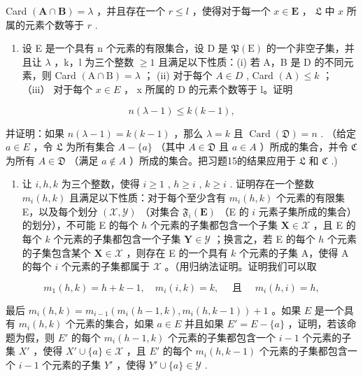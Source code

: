 Card \((\mathbf{A} \cap \mathbf{B}) = \lambda\) ，并且存在一个 \(r \leqslant l\) ，使得对于每一个 \(x \in \mathbf{E}\) ， \(\mathfrak{L}\) 中 \(x\) 所属的元素个数等于 \(r\) .

\begin{enumerate}
\def\labelenumi{\arabic{enumi}.}
\setcounter{enumi}{15}
\tightlist
\item
  设 E 是一个具有 n 个元素的有限集合，设 D 是 \(\mathfrak{P}(\mathrm{E})\) 的一个非空子集，并且让 \(\lambda\) ，k，l 为三个整数 \(\geqslant 1\) 且满足以下性质：(i) 若 A，B 是 D 的不同元素，则 Card \((\mathrm{A} \cap \mathrm{B}) = \lambda\) ； (ii) 对于每个 \(A \in D\) , Card \((\mathrm{A}) \leqslant k\) ； （iii） 对于每个 \(x \in E\) ， x 所属的 D 的元素个数等于 l。证明
\end{enumerate}

\[
n (\lambda - 1) \leqslant k (k - 1),
\]

并证明：如果 \(n(\lambda - 1) = k(k - 1)\) ，那么 \(\lambda = k\) 且 \(\operatorname{Card}(\mathfrak{D}) = n\) . （给定 \(a \in E\) ，令 \(\mathfrak{L}\) 为所有集合 \(A - \{a\}\) （其中 \(A \in \mathfrak{D}\) 且 \(a \in A\) ）所成的集合，并令 \(\mathfrak{C}\) 为所有 \(A \in \mathfrak{D}\) （满足 \(a \notin A\) ）所成的集合。把习题15的结果应用于 \(\mathfrak{L}\) 和 \(\mathfrak{C}\) .)

\begin{enumerate}
\def\labelenumi{\arabic{enumi}.}
\setcounter{enumi}{16}
\tightlist
\item
  让 \(i, h, k\) 为三个整数，使得 \(i \geqslant 1\) , \(h \geqslant i\) , \(k \geqslant i\) . 证明存在一个整数 \(m_i(h, k)\) 且满足以下性质：对于每个至少含有 \(m_i(h, k)\) 个元素的有限集 E，以及每个划分 \((\mathcal{X}, \mathcal{Y})\) （对集合 \(\mathfrak{F}_i(\mathbf{E})\) （E 的 \(i\) 元素子集所成的集合）的划分），不可能 E 的每个 \(h\) 个元素的子集都包含一个子集 \(\mathbf{X} \in \mathcal{X}\) ，且 E 的每个 \(k\) 个元素的子集都包含一个子集 \(\mathbf{Y} \in \mathcal{Y}\) ；换言之，若 E 的每个 \(h\) 个元素的子集包含某个 \(\mathbf{X} \in \mathcal{X}\) ，则存在 E 的一个具有 \(k\) 个元素的子集 A，使得 A 的每个 \(i\) 个元素的子集都属于 \(\mathcal{X}\) 。（用归纳法证明。证明我们可以取
\end{enumerate}

\[
m _ {1} (h, k) = h + k - 1, \quad m _ {i} (i, k) = k, \quad \text { 且 } \quad m _ {i} (h, i) = h,
\]

最后 \(m_i(h, k) = m_{i-1}(m_i(h-1, k), m_i(h, k-1)) + 1\) 。如果 \(E\) 是一个具有 \(m_i(h, k)\) 个元素的集合，如果 \(a \in E\) 并且如果 \(E' = E - \{a\}\) ，证明，若该命题为假，则 \(E'\) 的每个 \(m_i(h-1, k)\) 个元素的子集都包含一个 \(i-1\) 个元素的子集 \(X'\) ，使得 \(X' \cup \{a\} \in \mathcal{X}\) ，且 \(E'\) 的每个 \(m_i(h, k-1)\) 个元素的子集都包含一个 \(i-1\) 个元素的子集 \(Y'\) ，使得 \(Y' \cup \{a\} \in \mathcal{Y}\) .


